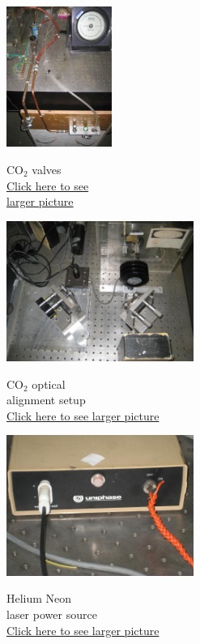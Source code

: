 \documentclass{../lab}
\begin{document}
\begin{figure}[H]
\captionsetup{justification=centering}
\centering
  \href{http://experimentationlab.berkeley.edu/sites/default/files/images/CO2_Valves_3568.jpg}{\includegraphics[height=130pt,keepaspectratio]{images/CO2_Valves_3568.jpg}}
  \caption{CO$_2$ valves\\ \href{http://experimentationlab.berkeley.edu/sites/default/files/images/CO2_Valves_3568.jpg}{Click here to see \\ larger picture}}
  \label{fig:CO2Valves}
\endminipage\hfill
{}
\centering
  \href{http://experimentationlab.berkeley.edu/sites/default/files/CO-2/CO2_Optics_3567_0.JPG}{\includegraphics[height=130pt,keepaspectratio]{images/CO2_Optics_3567_0.JPG}}
  \caption{CO$_2$ optical \\ alignment setup \\
  \href{http://experimentationlab.berkeley.edu/sites/default/files/CO-2/CO2_Optics_3567_0.JPG}{Click here to see larger picture}}
  \label{fig:OpticalAlignment}
\endminipage\hfill
{}
\centering
  \href{http://experimentationlab.berkeley.edu/sites/default/files/images/HeNepower.jpg}{\includegraphics[height=130pt,keepaspectratio]{images/HeNepower.jpg}}
  \caption{Helium Neon \\ laser power source \\ \href{http://experimentationlab.berkeley.edu/sites/default/files/images/HeNepower.jpg}{Click here to see larger picture}}\label{fig:HeNePower}
\endminipage
\end{figure}
\end{document}
